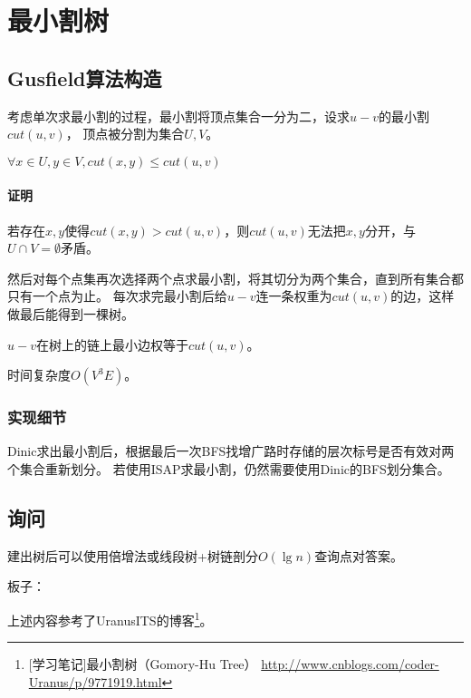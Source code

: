 \section{最小割树}
\subsection{Gusfield算法构造}

考虑单次求最小割的过程，最小割将顶点集合一分为二，设求$u-v$的最小割$cut(u,v)$，
顶点被分割为集合$U,V$。
\begin{lemma}
	$\forall x\in U,y\in V,cut(x,y)\leq cut(u,v)$
\end{lemma}
\paragraph{证明}
若存在$x,y$使得$cut(x,y)>cut(u,v)$，则$cut(u,v)$无法把$x,y$分开，与
$U\cap V=\emptyset$矛盾。

然后对每个点集再次选择两个点求最小割，将其切分为两个集合，直到所有集合都只有一个点为止。
每次求完最小割后给$u-v$连一条权重为$cut(u,v)$的边，这样做最后能得到一棵树。
\begin{theorem}
	$u-v$在树上的链上最小边权等于$cut(u,v)$。
\end{theorem}
时间复杂度$O(V^3E)$。
\subsubsection{实现细节}
Dinic求出最小割后，根据最后一次BFS找增广路时存储的层次标号是否有效对两个集合重新划分。
若使用ISAP求最小割，仍然需要使用Dinic的BFS划分集合。
\subsection{询问}
建出树后可以使用倍增法或线段树+树链剖分$O(\lg n)$查询点对答案。

板子：

上述内容参考了UranusITS的博客\footnote{
	[学习笔记]最小割树（Gomory-Hu Tree）
	\url{http://www.cnblogs.com/coder-Uranus/p/9771919.html}
}。
